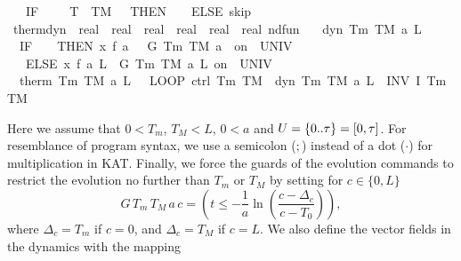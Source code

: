 \documentclass[envcountsame,envcountsect]{llncs}
\begin{document}
\begin{example}
\begin{isabellebody}
\ \ \ IF\ {\isacharparenleft}{\isasymTheta}\ {\isacharequal}\ {}\ {\isasymand}\ T\ {\isasymge}\ T\isactrlsub M\ {\isacharminus}\ {}{\isacharparenright}\ THEN\ {\isacharparenleft}{\isasymTheta}\ {\isacharcolon}{\isacharcolon}{\isacharequal}\ {}{\isacharparenright}\ ELSE\ skip{\isacharparenright}{\isachardoublequoteclose}\isanewline
\isanewline
{}\isamarkupfalse%
\ therm{\isacharunderscore}dyn\ {\isacharcolon}{\isacharcolon}\ {\isachardoublequoteopen}real\ {\isasymRightarrow}\ real\ {\isasymRightarrow}\ real\ {\isasymRightarrow}\ real\ {\isasymRightarrow}\ real\ {\isasymRightarrow}\ {\isacharparenleft}real{\isacharcircum}{}{\isacharparenright}\ nd{\isacharunderscore}fun{\isachardoublequoteclose}\isanewline
\ \ \ {\isachardoublequoteopen}dyn\ T\isactrlsub m\ T\isactrlsub M\ a\ L\ {\isasymtau}\ {\isasymequiv}\ \isanewline
\ \ {\isacharparenleft}IF\ {\isacharparenleft}{\isasymTheta}\ {\isacharequal}\ {}{\isacharparenright}\ THEN\ {\isacharparenleft}x{\isasymacute}{\isacharequal}\ f\ a\ {}\ {\isacharampersand}\ G\ T\isactrlsub m\ T\isactrlsub M\ a\ {}\ on\ {\isacharbraceleft}{}{\isachardot}{\isachardot}{\isasymtau}{\isacharbraceright}\ UNIV\ {\isacharat}\ {}{\isacharparenright}\ \isanewline
\ \ \ ELSE\ {\isacharparenleft}x{\isasymacute}{\isacharequal}\ f\ a\ L\ {\isacharampersand}\ G\ T\isactrlsub m\ T\isactrlsub M\ a\ L\ on\ {\isacharbraceleft}{}{\isachardot}{\isachardot}{\isasymtau}{\isacharbraceright}\ UNIV\ {\isacharat}\ {}{\isacharparenright}{\isacharparenright}{\isachardoublequoteclose}\isanewline
\isanewline
{}\isanewline
\ \ {\isachardoublequoteopen}therm\ T\isactrlsub m\ T\isactrlsub M\ a\ L\ {\isasymtau}\ {\isasymequiv}\ LOOP\ {\isacharparenleft}ctrl\ T\isactrlsub m\ T\isactrlsub M\ {\isacharsemicolon}\ dyn\ T\isactrlsub m\ T\isactrlsub M\ a\ L\ {\isasymtau}{\isacharparenright}\ INV\ {\isacharparenleft}I\ T\isactrlsub m\ T\isactrlsub M{\isacharparenright}{\isachardoublequoteclose}\isanewline
\end{isabellebody}

Here we assume that $0<T_m$, $T_M<L$, $0 < a$ and $U={\emph{$\{$}}{0}{\emph{$\mathord.$}}{\emph{$\mathord.$}}{\emph{$\tau$}}{\emph{$\}$}}=[0,\tau]$. For resemblance of program syntax, we use a semicolon ($;$) instead of a dot ($\cdot$) for multiplication in KAT. Finally, we force the guards of the evolution commands to restrict the evolution no further than $T_m$ or $T_M$ by setting for $c\in\{0,L\}$
\begin{equation*}
G\, T_m\, T_M\, a\, c = \left(t\leq -\frac{1}{a}\ln\left(\frac{c-\Delta_c}{c-T_0}\right)\right),
\end{equation*}
where $\Delta_c = T_m$ if $c=0$, and $\Delta_c = T_M$ if $c=L$. We also define the vector fields in the dynamics with the mapping


\end{example}
\end{document}

